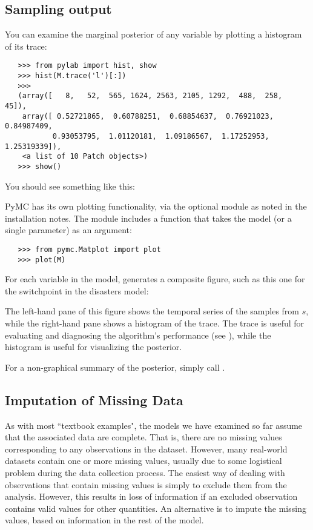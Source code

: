 \subsection{Sampling output} 
You can examine the marginal posterior of any variable by plotting a histogram of its trace:
\begin{verbatim}
   >>> from pylab import hist, show
   >>> hist(M.trace('l')[:])
   >>> 
   (array([   8,   52,  565, 1624, 2563, 2105, 1292,  488,  258,   45]),
    array([ 0.52721865,  0.60788251,  0.68854637,  0.76921023,  0.84987409,
           0.93053795,  1.01120181,  1.09186567,  1.17252953,  1.25319339]),
    <a list of 10 Patch objects>)
   >>> show()
\end{verbatim}
You should see something like this:
\begin{center}
\end{center}
PyMC has its own plotting functionality, via the optional
 module as noted in the installation notes. The
 module includes a  function that takes the
model (or a single parameter) as an argument:
\begin{verbatim}
   >>> from pymc.Matplot import plot
   >>> plot(M)
\end{verbatim}
For each variable in the model,  generates a composite figure, such as this one for the switchpoint in the disasters model:
\begin{center}
\end{center}
The left-hand pane of this figure shows the temporal series of the samples from $s$, while the right-hand pane shows a histogram of the trace. The trace is useful for evaluating and diagnosing the algorithm's performance (see \cite*{Gelman:2004fk}), while the histogram is useful for visualizing the posterior.

For a non-graphical summary of the posterior, simply call .

\hypertarget{missing}{}
\subsection{Imputation of Missing Data} %

As with most ``textbook examples", the models we have examined so far assume that the associated data are complete. That is, there are no missing values corresponding to any observations in the dataset. However, many real-world datasets contain one or more missing values, usually due to some logistical problem during the data collection process. The easiest way of dealing with observations that contain missing values is simply to exclude them from the analysis. However, this results in loss of information if an excluded observation contains valid values for other quantities. An alternative is to impute the missing values, based on information in the rest of the model.

